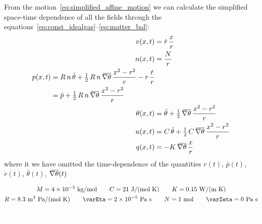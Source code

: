 \documentclass[\ifafour a4paper,12pt,\else a5paper,10pt,\fi%
onecolumn,oneside,article,%
british%
]{memoir}
\theoremstyle{remark}
\theoremstyle{innote}
\renewcommand*{\|}[1][]{\nonscript\,#1\vert\nonscript\;\mathopen{}}
\newcommand*{\widebar}[1]{{\mkern1.5mu\skew{2}\overline{\mkern-1.5mu#1\mkern-1.5mu}\mkern 1.5mu}}
\newcommand*{\yr}{r}
\newcommand*{\yrd}{\dot{\yr}}
\newcommand*{\yno}{N}
\newcommand*{\yt}{\theta}
\newcommand*{\yZ}{\varZeta}
\newcommand*{\yE}{\varEta}
\newcommand*{\yC}{C}
\newcommand*{\ytb}{\bar{\yt}}
\newcommand*{\ypb}{\bar{p}}
\newcommand*{\ygb}{\widebar{\nabla\yt}}
\begin{document}
From the motion~\eqref{eq:simplified_affine_motion} we can calculate the
simplified space-time dependence of all the fields through the
equations~\eqref{eq:const_idealgas}--\eqref{eq:matter_bal}:
\begin{align}
  \label{eq:v_motion}
  v(x,t) &= \yrd\, \frac{x}{\yr}
\\
\label{eq:n_motion}
n(x,t) &= \frac{\yno}{\yr}
\\
\label{eq:p_motion}
  \begin{split}
p(x,t) &= R\, n\, \ytb + \tfrac{1}{2} \,R \, n \, \ygb \,
         \frac{x^{2}-\yr^{2}}{\yr} - \yr \,\frac{\yrd}{\yr}
         \\&=
         \ypb + \tfrac{1}{2} \,R \, n \, \ygb \,
         \frac{x^{2}-\yr^{2}}{\yr} 
       \end{split}
\\
\label{eq:T_motion}
\yt(x,t) &= \ytb + \tfrac{1}{2}\, \ygb\, \frac{x^{2}-\yr^{2}}{\yr}
\\
\label{eq:u_motion}
  u(x,t) &= \yC \, \ytb +
           \tfrac{1}{2}\, \yC \,\ygb \,\frac{x^{2}-\yr^{2}}{\yr}
\\
\label{eq:q_motion}
q(x,t) &= - K \, \ygb \,\frac{x}{\yr}
\end{align}
where it we have omitted the time-dependence of the quantities $\yr(t)$, $\ypb(t)$,
$\yrd(t)$, $\ytb(t)$, $\ygb(t)$


\begin{equation}
  \label{eq:data}
  \begin{gathered}
  M = 4\times 10^{-3}\ \textrm{kg/mol}
  \qquad
  C = 21\ \textrm{J/(mol\ K)}
  \qquad
  K = 0.15\ \textrm{W/(m\ K)}
  \\
  R = 8.3\ \mathrm{m^{3}\ Pa/(mol\ K)}
  \qquad
  \yE = 2\times 10^{-5}\ \textrm{Pa\ s}
  \qquad
  N = 1\ \textrm{mol}
  \qquad
  \yZ = 0\ \textrm{Pa\ s}
\end{gathered}
\end{equation}


\textcolor{white}{If you find this you can claim a postcard from me.}
\fi
\end{document}
